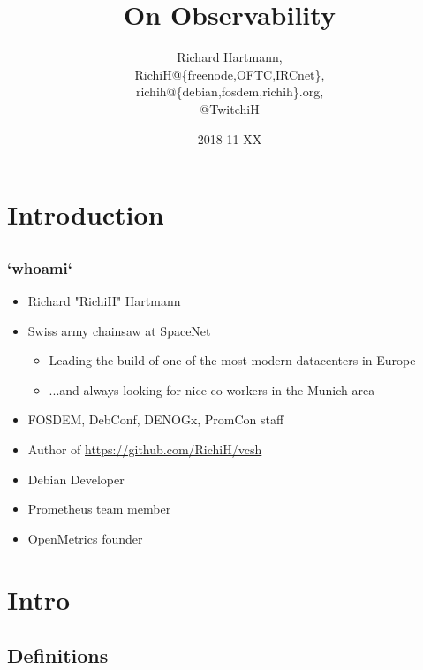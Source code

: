\documentclass[t]{beamer}
\title{On Observability}
\subtitle{}
\author{Richard Hartmann,\\
RichiH@\{freenode,OFTC,IRCnet\},\\
richih@\{debian,fosdem,richih\}.org,\\
@TwitchiH}
\date{2018-11-XX}
\begin{document}
\setcounter{tocdepth}{1}

\section{Introduction}

\subsection{}

\begin{frame}
	\titlepage
\end{frame}


\subsection{}

\begin{frame}
	\frametitle{`whoami`}
	\begin{itemize}
		\item Richard "RichiH" Hartmann
		\item Swiss army chainsaw at SpaceNet
		\begin{itemize}
			\item Leading the build of one of the most modern datacenters in Europe
			\item ...and always looking for nice co-workers in the Munich area
		\end{itemize}
		\item FOSDEM, DebConf, DENOGx, PromCon staff
		\item Author of \url{https://github.com/RichiH/vcsh}
		\item Debian Developer
		\item Prometheus team member
		\item OpenMetrics founder
	\end{itemize}
\end{frame}


\section{Intro}

\subsection{Definitions}
\end{document}

